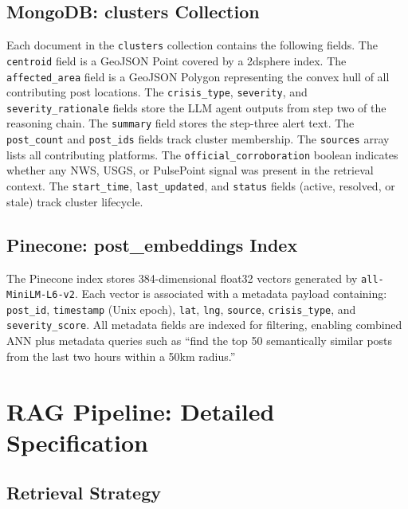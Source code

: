 \documentclass[conference]{IEEEtran}
\begin{document}
\subsection{MongoDB: clusters Collection}

Each document in the \texttt{clusters} collection contains the following fields.
The \texttt{centroid} field is a GeoJSON Point covered by a 2dsphere index. The
\texttt{affected\_area} field is a GeoJSON Polygon representing the convex hull
of all contributing post locations. The \texttt{crisis\_type}, \texttt{severity},
and \texttt{severity\_rationale} fields store the LLM agent outputs from step
two of the reasoning chain. The \texttt{summary} field stores the step-three
alert text. The \texttt{post\_count} and \texttt{post\_ids} fields track cluster
membership. The \texttt{sources} array lists all contributing platforms. The
\texttt{official\_corroboration} boolean indicates whether any NWS, USGS, or
PulsePoint signal was present in the retrieval context. The \texttt{start\_time},
\texttt{last\_updated}, and \texttt{status} fields (active, resolved, or stale)
track cluster lifecycle.

\subsection{Pinecone: post\_embeddings Index}

The Pinecone index stores 384-dimensional float32 vectors generated by
\texttt{all-MiniLM-L6-v2}. Each vector is associated with a metadata payload
containing: \texttt{post\_id}, \texttt{timestamp} (Unix epoch), \texttt{lat},
\texttt{lng}, \texttt{source}, \texttt{crisis\_type}, and
\texttt{severity\_score}. All metadata fields are indexed for filtering,
enabling combined ANN plus metadata queries such as ``find the top 50 semantically
similar posts from the last two hours within a 50km radius.''

\section{RAG Pipeline: Detailed Specification}

\subsection{Retrieval Strategy}
\end{document}
